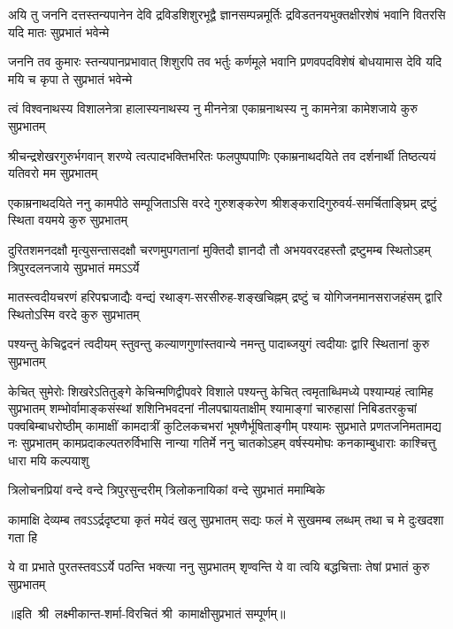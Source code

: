 \fourlineindentedshloka
{अयि तु जननि दत्तस्तन्यपानेन देवि}
{द्रविडशिशुरभूद्वै ज्ञानसम्पन्नमूर्तिः}
{द्रविडतनयभुक्तक्षीरशेषं भवानि}
{वितरसि यदि मातः सुप्रभातं भवेन्मे}

\fourlineindentedshloka
{जननि तव कुमारः स्तन्यपानप्रभावात्}
{शिशुरपि तव भर्तुः कर्णमूले भवानि}
{प्रणवपदविशेषं बोधयामास देवि}
{यदि मयि च कृपा ते सुप्रभातं भवेन्मे}

\fourlineindentedshloka
{त्वं विश्वनाथस्य विशालनेत्रा}
{हालास्यनाथस्य नु मीननेत्रा}
{एकाम्रनाथस्य नु कामनेत्रा}
{कामेशजाये कुरु सुप्रभातम्}

\fourlineindentedshloka
{श्रीचन्द्रशेखरगुरुर्भगवान् शरण्ये}
{त्वत्पादभक्तिभरितः फलपुष्पपाणिः}
{एकाम्रनाथदयिते तव दर्शनार्थी}
{तिष्ठत्ययं यतिवरो मम सुप्रभातम्}

\fourlineindentedshloka
{एकाम्रनाथदयिते ननु कामपीठे}
{सम्पूजिताऽसि वरदे गुरुशङ्करेण}
{श्रीशङ्करादिगुरुवर्य-समर्चिताङ्घ्रिम्}
{द्रष्टुं स्थिता वयमये कुरु सुप्रभातम्}

\fourlineindentedshloka
{दुरितशमनदक्षौ मृत्युसन्तासदक्षौ}
{चरणमुपगतानां मुक्तिदौ ज्ञानदौ तौ}
{अभयवरदहस्तौ द्रष्टुमम्ब स्थितोऽहम्}
{त्रिपुरदलनजाये सुप्रभातं ममऽऽर्ये}

\fourlineindentedshloka
{मातस्त्वदीयचरणं हरिपद्मजाद्यैः}
{वन्द्यं रथाङ्ग-सरसीरुह-शङ्खचिह्नम्}
{द्रष्टुं च योगिजनमानसराजहंसम्}
{द्वारि स्थितोऽस्मि वरदे कुरु सुप्रभातम्}

\fourlineindentedshloka
{पश्यन्तु केचिद्वदनं त्वदीयम्}
{स्तुवन्तु कल्याणगुणांस्तवान्ये}
{नमन्तु पादाब्जयुगं त्वदीयाः}
{द्वारि स्थितानां कुरु सुप्रभातम्}

\fourlineindentedshloka
{केचित् सुमेरोः शिखरेऽतितुङ्गे}
{केचिन्मणिद्वीपवरे विशाले}
{पश्यन्तु केचित् त्वमृताब्धिमध्ये}
{पश्याम्यहं त्वामिह सुप्रभातम्}
\setlength{\shlokaspaceskip}{16pt}
\fourlineindentedshloka
{शम्भोर्वामाङ्कसंस्थां शशिनिभवदनां नीलपद्मायताक्षीम्}
{श्यामाङ्गां चारुहासां निबिडतरकुचां पक्वबिम्बाधरोष्ठीम्}
{कामाक्षीं कामदात्रीं कुटिलकचभरां भूषणैर्भूषिताङ्गीम्}
{पश्यामः सुप्रभाते प्रणतजनिमतामद्य नः सुप्रभातम्}
\setlength{\shlokaspaceskip}{24pt}
\fourlineindentedshloka
{कामप्रदाकल्पतरुर्विभासि}
{नान्या गतिर्मे ननु चातकोऽहम्}
{वर्षस्यमोघः कनकाम्बुधाराः}
{काश्चित्तु धारा मयि कल्पयाशु}

\twolineshloka
{त्रिलोचनप्रियां वन्दे वन्दे त्रिपुरसुन्दरीम्}
{त्रिलोकनायिकां वन्दे सुप्रभातं ममाम्बिके}

\fourlineindentedshloka
{कामाक्षि देव्यम्ब तवऽऽर्द्रदृष्ट्या}
{कृतं मयेदं खलु सुप्रभातम्}
{सद्यः फलं मे सुखमम्ब लब्धम्}
{तथा च मे दुःखदशा गता हि}

\fourlineindentedshloka
{ये वा प्रभाते पुरतस्तवऽऽर्ये}
{पठन्ति भक्त्या ननु सुप्रभातम्}
{शृण्वन्ति ये वा त्वयि बद्धचित्ताः}
{तेषां प्रभातं कुरु सुप्रभातम्}

॥इति~श्री~लक्ष्मीकान्त-शर्मा-विरचितं श्री~कामाक्षीसुप्रभातं सम्पूर्णम्॥